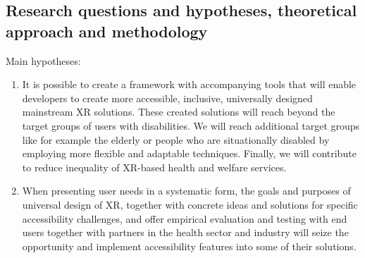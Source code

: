 \subsection{Research questions and hypotheses, theoretical approach and methodology}
Main hypotheses: 

\begin{enumerate}
\item It is possible to create a framework with accompanying tools that will enable developers to create more
accessible, inclusive, universally designed mainstream XR solutions. These created solutions will reach beyond the
target groups of users with disabilities. We will reach additional target groups like for example the elderly or people
who are situationally disabled by employing more flexible and adaptable techniques. Finally, we will contribute to
reduce inequality of XR-based health and welfare services. 
\item When presenting user needs in a systematic form, the goals and purposes of universal design of XR, together with
concrete ideas and solutions for specific accessibility challenges, and offer empirical evaluation and testing with end
users together with partners in the health sector and industry will seize the opportunity and implement accessibility
features into some of their solutions.
\end{enumerate}
